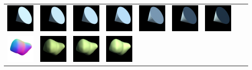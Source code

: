 \begin{center}
\begin{longtable}{@{}c@{}c@{}c@{}c@{}c@{}c@{}c@{}c@{}c@{}}
\includegraphics[width=0.1\linewidth]{training/21_1.png} & \includegraphics[width=0.1\linewidth]{training/21_2.png} &
\includegraphics[width=0.1\linewidth]{training/21_3.png} & \includegraphics[width=0.1\linewidth]{training/21_4.png} &
\includegraphics[width=0.1\linewidth]{training/21_5.png} & \includegraphics[width=0.1\linewidth]{training/21_6.png} &
\includegraphics[width=0.1\linewidth]{training/21_7.png} \\
\includegraphics[width=0.1\linewidth]{training/22_gt.png} & \includegraphics[width=0.1\linewidth]{training/22_0.png} &
\includegraphics[width=0.1\linewidth]{training/22_1.png} & \includegraphics[width=0.1\linewidth]{training/22_2.png} &

\end{longtable}
\end{center}

